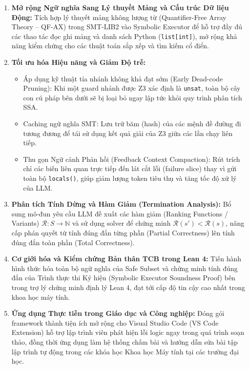 \begin{enumerate}
    \item \textbf{Mở rộng Ngữ nghĩa Sang Lý thuyết Mảng và Cấu trúc Dữ liệu Động:} Tích hợp lý thuyết mảng không lượng từ (Quantifier-Free Array Theory -- QF-AX) trong SMT-LIB2 vào Symbolic Executor để hỗ trợ đầy đủ các thao tác đọc ghi mảng và danh sách Python (\texttt{list[int]}), mở rộng khả năng kiểm chứng cho các thuật toán sắp xếp và tìm kiếm cổ điển.
    \item \textbf{Tối ưu hóa Hiệu năng và Giảm Độ trễ:}
    \begin{itemize}
        \item Áp dụng kỹ thuật tỉa nhánh không khả đạt sớm (Early Dead-code Pruning): Khi một guard nhánh được Z3 xác định là \texttt{unsat}, toàn bộ cây con cú pháp bên dưới sẽ bị loại bỏ ngay lập tức khỏi quy trình phân tích SSA.
        \item Caching ngữ nghĩa SMT: Lưu trữ băm (hash) của các mệnh đề đường đi tương đương để tái sử dụng kết quả giải của Z3 giữa các lần chạy liên tiếp.
        \item Thu gọn Ngữ cảnh Phản hồi (Feedback Context Compaction): Rút trích chỉ các biến liên quan trực tiếp đến lát cắt lỗi (failure slice) thay vì gửi toàn bộ \texttt{locals()}, giúp giảm lượng token tiêu thụ và tăng tốc độ xử lý của LLM.
    \end{itemize}
    \item \textbf{Phân tích Tính Dừng và Hàm Giảm (Termination Analysis):} Bổ sung mô-đun yêu cầu LLM đề xuất các hàm giảm (Ranking Functions / Variants) $\mathcal{R}: S \rightarrow \mathbb{N}$ và sử dụng solver để chứng minh $\mathcal{R}(s') < \mathcal{R}(s)$, nâng cấp phán quyết từ tính đúng đắn từng phần (Partial Correctness) lên tính đúng đắn toàn phần (Total Correctness).
    \item \textbf{Cơ giới hóa và Kiểm chứng Bản thân TCB trong Lean 4:} Tiến hành hình thức hóa toàn bộ ngữ nghĩa của Safe Subset và chứng minh tính đúng đắn của Trình thực thi Ký hiệu (Symbolic Executor Soundness Proof) bên trong trợ lý chứng minh định lý Lean 4, đạt tới cấp độ tin cậy cao nhất trong khoa học máy tính.
    \item \textbf{Ứng dụng Thực tiễn trong Giáo dục và Công nghiệp:} Đóng gói framework thành tiện ích mở rộng cho Visual Studio Code (VS Code Extension) hỗ trợ lập trình viên phát hiện lỗi logic ngay trong quá trình soạn thảo, đồng thời ứng dụng làm hệ thống chấm bài và hướng dẫn sửa bài tập lập trình tự động trong các khóa học Khoa học Máy tính tại các trường đại học.
\end{enumerate}
